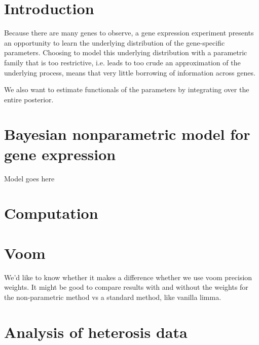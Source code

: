 
\section{Introduction}
Because there are many genes to observe, a gene expression experiment presents an opportunity to learn the underlying distribution of the gene-specific parameters. Choosing to model this underlying distribution with a parametric family that is too restrictive, i.e. leads to too crude an approximation of the underlying process, means that very little borrowing of information across genes.

We also want to estimate functionals of the parameters by integrating over the entire posterior.

\section{Bayesian nonparametric model for gene expression}

Model goes here

\section{Computation}

\section{Voom}
We'd like to know whether it makes a difference whether we use voom precision weights. It might be good to compare results with and without the weights for the non-parametric method vs a standard method, like vanilla limma.

\section{Analysis of heterosis data}


